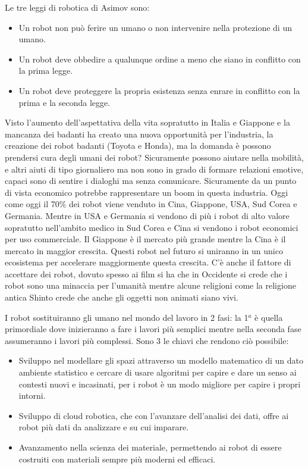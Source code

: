 \documentclass[a4page, 11pt]{article}
\begin{document}
Le tre leggi di robotica di Asimov sono:

\begin{itemize}
	 
	\item
	Un robot non può ferire un umano o non intervenire nella protezione di
	un umano.
	\item
	Un robot deve obbedire a qualunque ordine a meno che siano in
	conflitto con la prima legge.
	\item
	Un robot deve proteggere la propria esistenza senza enrare in
	conflitto con la prima e la seconda legge.
\end{itemize}

Visto l'aumento dell'aspettativa della vita sopratutto in Italia e
Giappone e la mancanza dei badanti ha creato una nuova opportunità per
l'industria, la creazione dei robot badanti (Toyota e Honda), ma la
domanda è possono prendersi cura degli umani dei robot? Sicuramente
possono aiutare nella mobilità, e altri aiuti di tipo giornaliero ma non
sono in grado di formare relazioni emotive, capaci sono di sentire i
dialoghi ma senza comunicare. Sicuramente da un punto di vista economico
potrebbe rappresentare un boom in questa industria. Oggi come oggi il
70\% dei robot viene venduto in Cina, Giappone, USA, Sud Corea e
Germania. Mentre in USA e Germania si vendono di più i robot di alto
valore sopratutto nell'ambito medico in Sud Corea e Cina si vendono i
robot economici per uso commerciale. Il Giappone è il mercato più grande
mentre la Cina è il mercato in maggior crescita. Questi robot nel futuro
si uniranno in un unico ecosistema per accelerare maggiormente questa
crescita. C'è anche il fattore di accettare dei robot, dovuto spesso ai
film si ha che in Occidente si crede che i robot sono una minaccia per
l'umanità mentre alcune religioni come la religione antica Shinto crede
che anche gli oggetti non animati siano vivi.

I robot sostituiranno gli umano nel mondo del lavoro in 2 fasi: la 1$^a$ è
quella primordiale dove inizieranno a fare i lavori più semplici mentre
nella seconda fase assumeranno i lavori più complessi. Sono 3 le chiavi
che rendono ciò possibile:

\begin{itemize}
	 
	\item
	Sviluppo nel modellare gli spazi attraverso un modello matematico di
	un dato ambiente statistico e cercare di usare algoritmi per capire e
	dare un senso ai contesti nuovi e incasinati, per i robot è un modo
	migliore per capire i propri intorni.
	\item
	Sviluppo di cloud robotica, che con l'avanzare dell'analisi dei dati,
	offre ai robot più dati da analizzare e su cui imparare.
	\item
	Avanzamento nella scienza dei materiale, permettendo ai robot di
	essere costruiti con materiali sempre più moderni ed efficaci.
\end{itemize}
\end{document}
